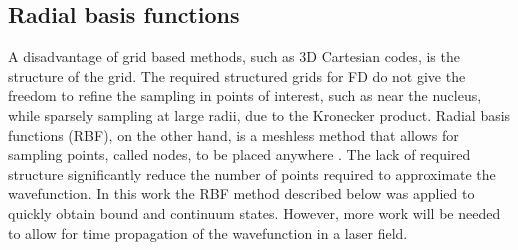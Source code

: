 \subsection{Radial basis functions} %
\label{sub:radial_basis_functions}
A disadvantage of grid based methods, such as 3D Cartesian codes, is the structure of the grid. The required structured grids for FD do not give the freedom to refine the sampling in points of interest, such as near the nucleus, while sparsely sampling at large radii, due to the Kronecker product. Radial basis functions (RBF), on the other hand, is a meshless method that allows for sampling points, called nodes, to be placed anywhere \cite{Fornberg2015}. The lack of required structure significantly reduce the number of points required to approximate the wavefunction. In this work the RBF method described below was applied to quickly obtain bound and continuum states. However, more work will be needed to allow for time propagation of the wavefunction in a laser field. 

